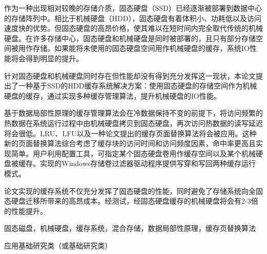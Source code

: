 
\begin{cabstract}

作为一种出现相对较晚的存储介质，固态硬盘（SSD）已经逐渐被部署到数据中心的存储阵列中。相比于机械硬盘（HDD），固态硬盘有着体积小、功耗低以及访问速度快的优势。但固态硬盘的高昂价格，使其难以在短时间内完全取代传统的机械硬盘。在许多存储中心，固态硬盘和机械硬盘是同时被部署的，且只有部分存储空间被用作存储。如果能将未使用的固态硬盘空间用作机械硬盘的缓存，系统IO性能将会得到明显的提升。

针对固态硬盘和机械硬盘同时存在但性能却没有得到充分发挥这一现状，本论文提出了一种基于SSD的HDD缓存系统解决方案：使用固态硬盘的存储空间作为机械硬盘的缓存，通过实现多种缓存管理算法，提升机械硬盘的IO性能。

基于数据局部性原理的缓存管理算法会在冷数据保持不变的前提下，将访问频繁的热数据在系统运行过程中由机械硬盘拷贝到固态硬盘，再次访问热数据的读写延迟将会很低。LRU、LFU以及一种论文提出的缓存页面替换算法将会被应用。这种新的页面替换算法综合考虑了缓存块的访问时间和访问频度因素，命中率更高且实现简单。用户利用配置工具，可指定某个固态硬盘卷用作缓存空间以及某个机械硬盘被缓存。实现的Windows存储卷过滤器驱动程序提供写穿和写回两种缓存运行模式。

论文实现的缓存系统不仅充分发挥了固态硬盘的性能，同时避免了存储系统向全固态硬盘迁移所带来的高昂成本。经测试，经固态硬盘缓存的机械硬盘将会有2-3倍的性能提升。

\end{cabstract}

\begin{ckeywords}
固态磁盘，机械硬盘，缓存系统，混合存储，数据局部性原理，缓存页替换算法
\end{ckeywords}

\begin{cthesistype}
应用基础研究类（或基础研究类）
\end{cthesistype}


